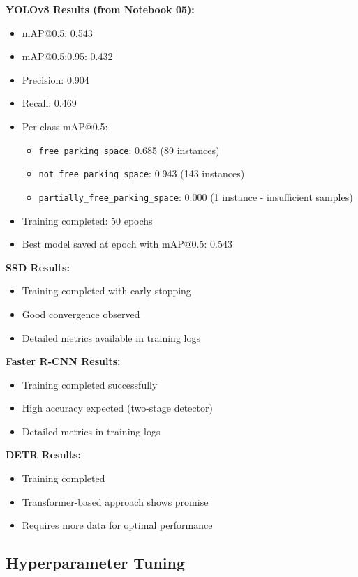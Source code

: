 \documentclass[12pt,a4paper]{article}
\begin{document}
\textbf{YOLOv8 Results (from Notebook 05):}
\begin{itemize}
    \item mAP@0.5: 0.543
    \item mAP@0.5:0.95: 0.432
    \item Precision: 0.904
    \item Recall: 0.469
    \item Per-class mAP@0.5:
    \begin{itemize}
        \item \texttt{free\_parking\_space}: 0.685 (89 instances)
        \item \texttt{not\_free\_parking\_space}: 0.943 (143 instances)
        \item \texttt{partially\_free\_parking\_space}: 0.000 (1 instance - insufficient samples)
    \end{itemize}
    \item Training completed: 50 epochs
    \item Best model saved at epoch with mAP@0.5: 0.543
\end{itemize}

\textbf{SSD Results:}
\begin{itemize}
    \item Training completed with early stopping
    \item Good convergence observed
    \item Detailed metrics available in training logs
\end{itemize}

\textbf{Faster R-CNN Results:}
\begin{itemize}
    \item Training completed successfully
    \item High accuracy expected (two-stage detector)
    \item Detailed metrics in training logs
\end{itemize}

\textbf{DETR Results:}
\begin{itemize}
    \item Training completed
    \item Transformer-based approach shows promise
    \item Requires more data for optimal performance
\end{itemize}

\subsection{Hyperparameter Tuning}
\end{document}
